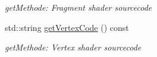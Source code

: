 \begin{DoxyCompactItemize}
\begin{DoxyCompactList}\small\item\em getMethode: Fragment shader sourcecode \item\end{DoxyCompactList}\item 
\hypertarget{class_f2_c_1_1_shader_g_l_a3c44d43812f1308eee2ffef5500bba93}{
std::string \hyperlink{class_f2_c_1_1_shader_g_l_a3c44d43812f1308eee2ffef5500bba93}{getVertexCode} () const }
\label{class_f2_c_1_1_shader_g_l_a3c44d43812f1308eee2ffef5500bba93}

\begin{DoxyCompactList}\small\item\em getMethode: Vertex shader sourcecode \item\end{DoxyCompactList}\end{DoxyCompactItemize}
